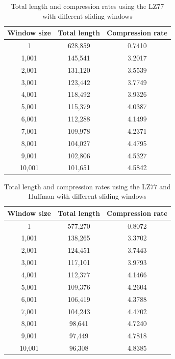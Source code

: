 \documentclass[]{template}
\begin{document}
    \begin{table}[ht]
        \centering
        \begin{tabular}{|c|c|c|}
            \hline
            Window size & Total length & Compression rate \\ \hline
            1 & 628,859 & 0.7410 \\ \hline
            1,001 & 145,541 & 3.2017 \\ \hline
            2,001 & 131,120 & 3.5539 \\ \hline
            3,001 & 123,442 & 3.7749 \\ \hline
            4,001 & 118,492 & 3.9326 \\ \hline
            5,001 & 115,379 & 4.0387 \\ \hline
            6,001 & 112,288 & 4.1499 \\ \hline
            7,001 & 109,978 & 4.2371 \\ \hline
            8,001 & 104,027 & 4.4795 \\ \hline
            9,001 & 102,806 & 4.5327 \\ \hline
            10,001 & 101,651 & 4.5842 \\ \hline
        \end{tabular}
        \caption{ Total length and compression rates using the LZ77 with different sliding windows}\label{tab:lz77}
    \end{table}

    \begin{table}[ht]
        \centering
        \begin{tabular}{|c|c|c|}
            \hline
            Window size & Total length & Compression rate \\ \hline
            1 & 577,270 & 0.8072 \\ \hline
            1,001 & 138,265 & 3.3702 \\ \hline
            2,001 & 124,451 & 3.7443 \\ \hline
            3,001 & 117,101 & 3.9793 \\ \hline
            4,001 & 112,377 & 4.1466 \\ \hline
            5,001 & 109,376 & 4.2604 \\ \hline
            6,001 & 106,419 & 4.3788 \\ \hline
            7,001 & 104,243 & 4.4702 \\ \hline
            8,001 & 98,641 & 4.7240 \\ \hline
            9,001 & 97,449 & 4.7818 \\ \hline
            10,001 & 96,308 & 4.8385 \\ \hline
        \end{tabular}
        \caption{ Total length and compression rates using the LZ77 and Huffman with different sliding windows}\label{tab:lz77_huffman}
    \end{table}
\end{document}
